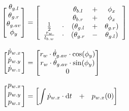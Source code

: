 \documentclass[crop=false,float=true,class=scrreprt]{standalone}
\begin{document}
\begin{align}
\label{SEC:hwePlantDynamicsModel:nonlinear:coordinateSystem:begin}
\begin{bmatrix}
\hphantom{\theta_{g.av}}\\[-2em]
\theta_{g.l}  \\
\theta_{g.r}  \\
\theta_{g.av} \\
\phi_{y}      \\
\end{bmatrix}
& =
\begin{bmatrix}
\begin{array}{ccccc}
                      &       &   \theta_{b.l} & + & \phi_{x}       \\
                      &       &   \theta_{b.r} & + & \phi_{x}       \\
\frac{1}{2}           & \cdot & ( \theta_{g.l} & + & \theta_{g.r} ) \\
\frac{r_{w}}{l_{b.w}} & \cdot & ( \theta_{g.r} & - & \theta_{g.l} ) \\
\end{array}
\end{bmatrix}
\\[+1em]
\begin{bmatrix}
\hphantom{\theta_{g.av}}\\[-2em]
\dot{p}_{w.x} \\
\dot{p}_{w.y} \\
\dot{p}_{w.z} \\
\end{bmatrix}
& =
\begin{bmatrix}
r_{w} \cdot \dot{\theta}_{g.av} \cdot \mathrm{cos}(\phi_{y}) \\
r_{w} \cdot \dot{\theta}_{g.av} \cdot \mathrm{sin}(\phi_{y}) \\
0                                                            \\
\end{bmatrix}
\\[+1em]
\begin{bmatrix}
\hphantom{\theta_{g.av}}\\[-2em]
p_{w.x} \\
p_{w.y} \\
p_{w.z} \\
\end{bmatrix}
& =
\begin{bmatrix}
\displaystyle\int \dot{p}_{w.x} \cdot \mathrm{d}t & + & p_{w.x}( 0 ) \\

\end{bmatrix}
\end{align}
\end{document}

